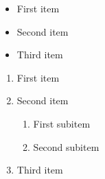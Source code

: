 \documentclass[12pt]{article}
\begin{document}
	\begin{itemize}
		\item First item
		\item Second item
		\item Third item
	\end{itemize}

	\begin{enumerate}
		\renewcommand{\labelenumi}{.R\arabic{enumi}}
		\item First item
		\item Second item
		\begin{enumerate}
			\renewcommand{\labelenumii}{.R\arabic{enumi}.\arabic{enumii}}
			\item First subitem
			\item Second subitem
		\end{enumerate}
		\item Third item
	\end{enumerate}
\end{document}
